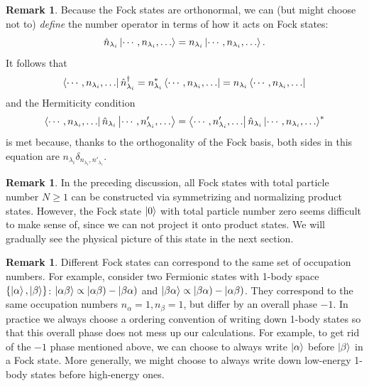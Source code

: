 \documentclass{article}
\theoremstyle{definition}
\newtheorem{rem}[mot]{Remark}
\numberwithin{equation}{section}
\begin{document}
    \begin{rem}
        \label{rem:from-Fock-states-to-number-operator}
        Because the Fock states are orthonormal, 
        we can (but might choose not to) 
        \textit{define} the number operator 
        in terms of how it acts on Fock states: 
        \[
            \hat{n}_{\lambda_{i}}
            \ket{\cdots ,n_{\lambda_{i}}, \ldots }
            =
            n_{\lambda_{i}}
            \ket{\cdots ,n_{\lambda_{i}}, \ldots }.
        \]
        It follows that 
        \[
            \bra{\cdots ,n_{\lambda_{i}}, \ldots }
            \hat{n}^{\dagger}_{\lambda_{i}}
            =
            n^{*}_{\lambda_{i}}
            \bra{\cdots ,n_{\lambda_{i}}, \ldots }
            =
            n_{\lambda_{i}}
            \bra{\cdots ,n_{\lambda_{i}}, \ldots }
        \]
        and the Hermiticity condition 
        \[
            \bra{\cdots ,n_{\lambda_{i}}, \ldots }
            \hat{n}_{\lambda_{i}}
            \ket{\cdots ,n'_{\lambda_{i}}, \ldots }
            =
            \bra{\cdots ,n'_{\lambda_{i}}, \ldots }
            \hat{n}_{\lambda_{i}}
            \ket{\cdots ,n_{\lambda_{i}}, \ldots }^{*}
        \]
        is met because, thanks to the 
        orthogonality of the Fock basis, both sides 
        in this equation are 
        $n_{\lambda_{i}} \delta_{n_{\lambda_{i}},n'_{\lambda_{i}}} $.
    \end{rem}

    \begin{rem}
        In the preceding discussion, 
        all Fock states with total particle number 
        $N\ge 1$ can be constructed 
        via symmetrizing and normalizing 
        product states. 
        However, the Fock state $\ket{0}$ 
        with total particle number zero 
        seems difficult to make sense of, 
        since we can not project it onto 
        product states. 
        We will gradually see the 
        physical picture of this state 
        in the next section.
    \end{rem}

    \begin{rem}
        Different Fock states 
        can correspond to the same set of 
        occupation numbers. 
        For example, 
        consider two Fermionic states 
        with 1-body space 
        $\{\ket{\alpha},\ket{\beta}\}$: 
        $\ket{\alpha \beta} \propto |\alpha \beta) - |\beta \alpha)$ 
        and 
        $\ket{\beta \alpha} \propto |\beta \alpha) - |\alpha \beta)$. 
        They correspond to the same 
        occupation numbers 
        $n_{\alpha}=1, n_{\beta}=1$, 
        but differ by an overall phase $-1$. 
        In practice we always choose a ordering 
        convention of writing down 1-body states 
        so that this overall phase does not mess up 
        our calculations. 
        For example, 
        to get rid of the $-1$ phase mentioned above, 
        we can choose to always write 
        $\ket{\alpha}$ before $\ket{\beta}$ 
        in a Fock state. 
        More generally, we might choose to always 
        write down low-energy 1-body states 
        before high-energy ones. 
    \label{rem:partially-normalized-states-can-differ-by-overall-sign}
    \end{rem}
\end{document}
